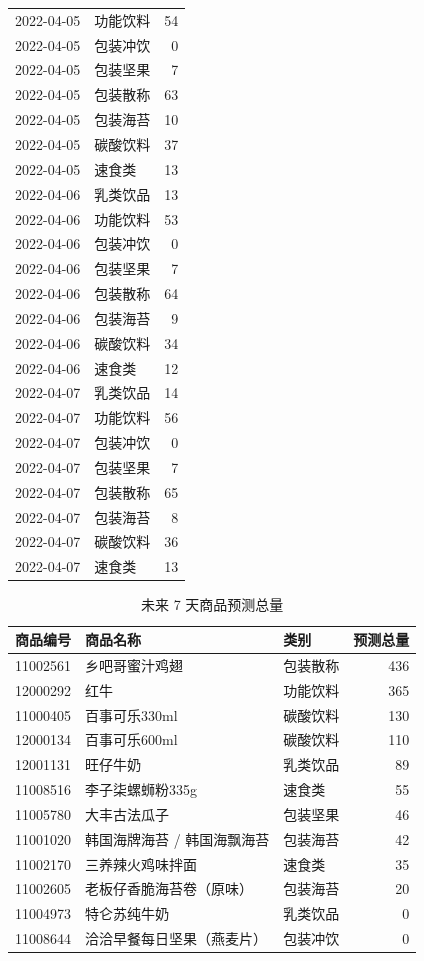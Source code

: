 \begin{longtable}{clr}
2022-04-05 & 功能饮料 & 54 \\
2022-04-05 & 包装冲饮 & 0 \\
2022-04-05 & 包装坚果 & 7 \\
2022-04-05 & 包装散称 & 63 \\
2022-04-05 & 包装海苔 & 10 \\
2022-04-05 & 碳酸饮料 & 37 \\
2022-04-05 & 速食类 & 13 \\
2022-04-06 & 乳类饮品 & 13 \\
2022-04-06 & 功能饮料 & 53 \\
2022-04-06 & 包装冲饮 & 0 \\
2022-04-06 & 包装坚果 & 7 \\
2022-04-06 & 包装散称 & 64 \\
2022-04-06 & 包装海苔 & 9 \\
2022-04-06 & 碳酸饮料 & 34 \\
2022-04-06 & 速食类 & 12 \\
2022-04-07 & 乳类饮品 & 14 \\
2022-04-07 & 功能饮料 & 56 \\
2022-04-07 & 包装冲饮 & 0 \\
2022-04-07 & 包装坚果 & 7 \\
2022-04-07 & 包装散称 & 65 \\
2022-04-07 & 包装海苔 & 8 \\
2022-04-07 & 碳酸饮料 & 36 \\
2022-04-07 & 速食类 & 13 \\
\bottomrule
\end{longtable}
\endgroup

\begin{table}[H]
\centering
\caption{未来 7 天商品预测总量}
\small
\begin{tabular}{rllr}
\toprule
商品编号 & 商品名称 & 类别 & 预测总量 \\
\midrule
11002561 & 乡吧哥蜜汁鸡翅 & 包装散称 & 436 \\
12000292 & 红牛 & 功能饮料 & 365 \\
11000405 & 百事可乐330ml & 碳酸饮料 & 130 \\
12000134 & 百事可乐600ml & 碳酸饮料 & 110 \\
12001131 & 旺仔牛奶 & 乳类饮品 & 89 \\
11008516 & 李子柒螺蛳粉335g & 速食类 & 55 \\
11005780 & 大丰古法瓜子 & 包装坚果 & 46 \\
11001020 & 韩国海牌海苔 / 韩国海飘海苔 & 包装海苔 & 42 \\
11002170 & 三养辣火鸡味拌面 & 速食类 & 35 \\
11002605 & 老板仔香脆海苔卷（原味） & 包装海苔 & 20 \\
11004973 & 特仑苏纯牛奶 & 乳类饮品 & 0 \\
11008644 & 洽洽早餐每日坚果（燕麦片） & 包装冲饮 & 0 \\
\bottomrule
\end{tabular}
\end{table}

